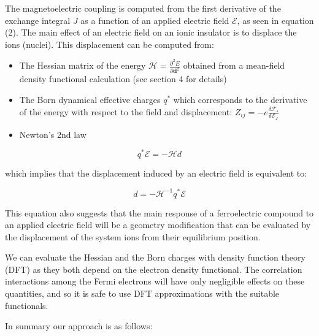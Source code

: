 \documentclass[10pt]{article}
\begin{document}
The magnetoelectric coupling is computed from the first derivative of the exchange integral $J$ as a function of an applied electric field $\mathcal{E}$, as seen in equation (2). The main effect of an electric field on an ionic insulator is to displace the ions (nuclei). This displacement can be computed from:
\begin{itemize}
	\item The Hessian matrix of the
	energy $\mathcal{H} = \frac{\partial^2 E}{\partial \mathbf{d} ^2} $ obtained
	from a mean-field density functional calculation (see section 4 for details)
	\item The Born dynamical effective charges $q^*$ which corresponds to the derivative of the energy with respect to the field and displacement: $Z_{ij} = -e\frac{\delta \mathcal{F_i}}{\delta \mathcal{E_j}}$ \cite{lepetit2016compute}
	\item Newton's 2nd law
\end{itemize}

\begin{equation}
	q^* \mathcal{E} = -\mathcal{H} d
\end{equation}

which implies that the displacement induced by an electric field is equivalent to:

$$ d = -\mathcal{H}^{-1} q^* \mathcal{E} $$

This equation also suggests that the main response of a ferroelectric compound to an applied electric field will be a geometry modification that can be evaluated by the displacement of the system ions from their equilibrium position. 

We can evaluate the Hessian and the Born charges with density function theory (DFT) as they both depend on the electron density functional. The correlation interactions among the Fermi electrons will have only negligible effects on these quantities, and so it is safe to use DFT approximations with the suitable functionals.

In summary our approach is as follows:
\end{document}
